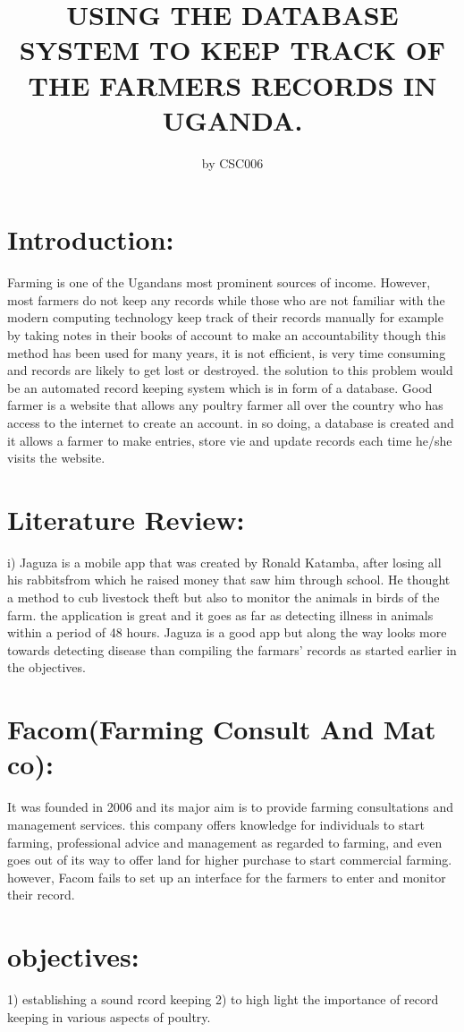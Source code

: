 \documentclass[10pt,letterpaper]{article}
\begin{document}
\title{USING THE DATABASE SYSTEM TO KEEP TRACK OF THE FARMERS RECORDS IN UGANDA.}
\author{by CSC006  }
\maketitle
\section{Introduction:}
Farming is one of the Ugandans most prominent sources of income. However, most farmers do not keep any records while those who are not familiar with the modern computing technology keep track of their records manually for example by taking notes in their books of account to make an accountability though this method has been used for many years, it is not efficient, is very time consuming and records are likely to get lost or destroyed. the solution to this problem would be an automated record keeping system which is in form of a database.
Good farmer is a website that allows any poultry farmer all over the country who has access to the internet to create an account. in so doing, a database is created and it allows a farmer to make entries, store vie and update records each time he/she visits the website. 
\section{Literature Review:}
i) Jaguza is a mobile app that was created by Ronald Katamba, after losing all his rabbitsfrom which he raised money that saw him through school. He thought a method to cub livestock theft but also to monitor the animals in birds of the farm.
the application is great and it goes as far as detecting illness in animals within a period of 48 hours.
Jaguza is a good app but along the way looks more towards detecting disease than compiling the farmars' records as started earlier in the objectives.  
\section{Facom(Farming Consult And Mat co):}
It was founded in 2006 and its major aim is to provide farming consultations and management services.
this company offers knowledge for individuals to start farming, professional advice and management as regarded to farming, and even goes out of its way to offer land for higher purchase to start commercial farming.
however, Facom fails to set up an interface for the farmers to enter and monitor their record.
\section{objectives:}
1)  establishing a sound rcord keeping
2) to high light the importance of record keeping in various aspects of poultry.
\end{document}
